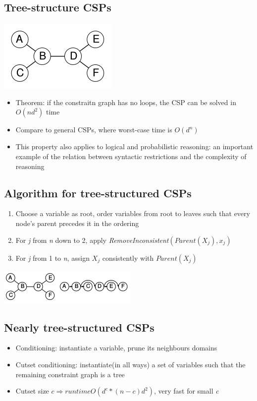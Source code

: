 \subsection{Tree-structure CSPs}
\includegraphics[scale=1]{chap1_pics/treestructure.png}

\begin{itemize}
\item Theorem: if the constraitn graph has no loops, the CSP can be solved in $O(nd^2)$ time
\item Compare to general CSPs, where worst-case time is $O(d^n)$
\item This property also applies to logical and probabilistic reasoning: an important example of the relation between syntactic restrictions and the complexity of reasoning
\end{itemize}

\subsection{Algorithm for tree-structured CSPs}
\begin{enumerate}
\item Choose a variable as root, order variables from root to leaves such that every node's parent precedes it in the ordering
\item For \textit{j} from \textit{n} down to 2, apply \textit{RemoveInconsistent}$(Parent(X_j),x_j)$
\item For \textit{j} from 1 to \textit{n}, assign $X_j$ consistently with $Parent(X_j)$
\end{enumerate}
\includegraphics[scale=1]{chap1_pics/treestructurealgorithm.png} 

\subsection{Nearly tree-structured CSPs}
\begin{itemize}
\item Conditioning: instantiate a variable, prune its neighbours domains
\item Cutset conditioning: instantiate(in all ways) a set of variables such that the remaining constraint graph is a tree
\item Cutset size $c \Rightarrow runtime O(d^c * (n-c)d^2)$, very fast for small \textit{c}
\end{itemize}

